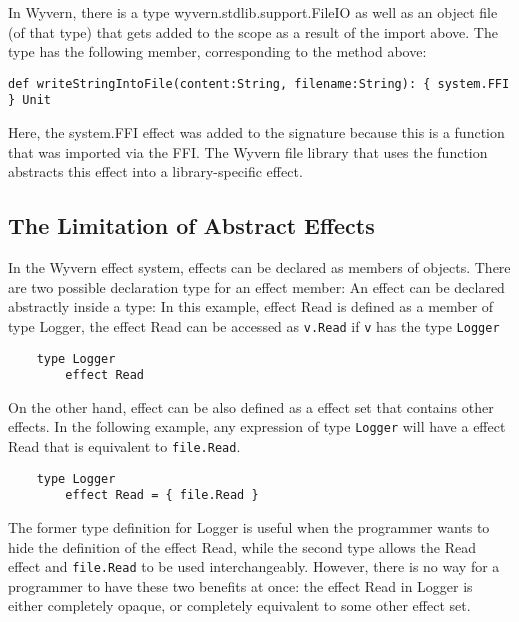 In Wyvern, there is a type wyvern.stdlib.support.FileIO as well as an object file (of that type) that gets added to the scope as a result of the import above. The type has the following member, corresponding to the method above: \\
\begin{minipage}{\linewidth}
\begin{lstlisting}[xleftmargin=-5pt, numbers=none]
  def writeStringIntoFile(content:String, filename:String): { system.FFI } Unit 
\end{lstlisting}
\end{minipage}

Here, the system.FFI effect was added to the signature because this is a function that was imported via the FFI. The Wyvern file library that uses the  function abstracts this  effect into a library-specific  effect.


\subsection{The Limitation of  Abstract Effects}

In the Wyvern effect system, effects can be declared as members of objects. There are two possible declaration type for an effect member: An effect can be declared abstractly inside a type: In this example, effect Read is defined as a member of type Logger, the effect Read can be accessed as \texttt{v.Read} if \texttt{v} has the type \texttt{Logger}
\begin{verbatim}
    type Logger
        effect Read
\end{verbatim}
On the other hand, effect can be also defined as a effect set that contains other effects. In the following example, any expression of type \texttt{Logger} will have a effect Read that is equivalent to \texttt{file.Read}.
\begin{verbatim}
    type Logger
        effect Read = { file.Read }
\end{verbatim}
The former type definition for Logger is useful when the programmer wants to hide the definition of the effect Read, while the second type allows the Read effect and \texttt{file.Read} to be used interchangeably. However, there is no way for a programmer to have these two benefits at once: the effect Read in Logger is either completely opaque, or completely equivalent to some other effect set.





